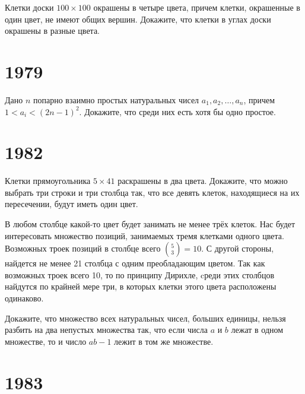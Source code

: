 \documentclass[11pt, a4paper]{common/document_template}
\begin{document}
\begin{exercise}[28]
Клетки доски $100 \times 100$ окрашены в четыре цвета, причем клетки, окрашенные в один цвет, не имеют общих вершин. Докажите, что клетки в углах доски окрашены в разные цвета.
\end{exercise}

\chapter{1979}

\begin{exercise}[22]
Дано $n$ попарно взаимно простых натуральных чисел $a_{1}, a_{2}, \dots, a_{n}$, причем $1 < a_{i} < (2n - 1)^{2}$. Докажите, что среди них есть хотя бы одно простое.
\end{exercise}

\chapter{1982}

\begin{exercise}[23]
Клетки прямоугольника $5 \times 41$ раскрашены в два цвета. Докажите, что можно выбрать три строки и три столбца так, что все девять клеток, находящиеся на их пересечении, будут иметь один цвет.
\end{exercise}

\begin{Solution}
В любом столбце какой-то цвет будет занимать не менее трёх клеток. Нас будет интересовать множество позиций, занимаемых тремя клетками одного цвета. Возможных троек позиций в столбце всего $\binom{5}{3} = 10$.
С другой стороны, найдется не менее 21 столбца с одним преобладающим цветом. Так как возможных троек всего 10, то по принципу Дирихле, cреди этих столбцов найдутся по крайней мере три, в которых клетки этого цвета расположены одинаково.
\end{Solution}

\begin{exercise}[44]
Докажите, что множество всех натуральных чисел, больших единицы, нельзя разбить на два непустых множества так, что если числа $a$ и $b$ лежат в одном множестве, то и число $ab - 1$ лежит в том же множестве.
\end{exercise}

\chapter{1983}
\end{document}

